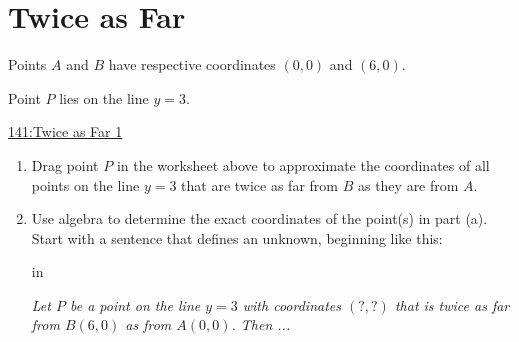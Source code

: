 \documentclass{ximera}
\newcommand{\pskip}{\vskip 0.1 in}
\begin{document}
\section{Twice as Far}

\begin{question} \label{Qdr1004bx0}

Points $A$ and $B$ have respective coordinates $(0,0)$ and $(6,0)$.

Point $P$ lies on the line $y=3$.

\begin{onlineOnly}
    \begin{center}
\end{center}
\end{onlineOnly}

\href{https://www.desmos.com/calculator/ytgx4n8p6g}{141:Twice as Far 1}

\begin{enumerate}
\item Drag point $P$ in the worksheet above to approximate the coordinates of all points on the line $y=3$ that are twice as far from $B$ as they are from $A$.

\item Use algebra to determine the exact coordinates of the point(s) in part (a). Start with a sentence that defines an unknown, beginning like this:

\pskip

\emph{Let $P$ be a point on the line $y=3$ with coordinates $(?,?)$ that is twice as far from $B(6,0)$ as from $A(0,0)$. Then ...}
\end{enumerate}
\end{question}
\end{document}
